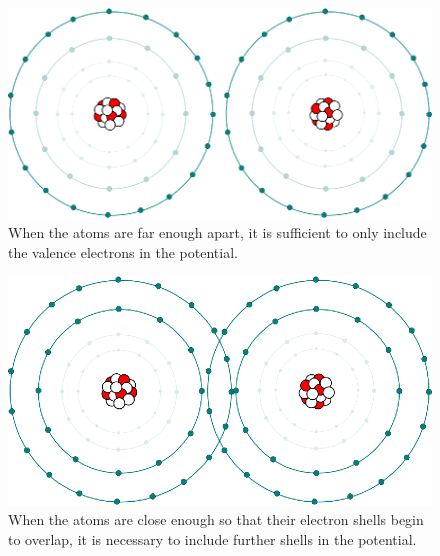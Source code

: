 \documentclass{article}
\begin{document}


\begin{figure}[H]
  \centering
  \includegraphics[scale=0.9]{img/pseudo-pot-far.eps}
  \caption{When the atoms are far enough apart, it is sufficient to only include the valence electrons in the potential.}
  \label{fig:pseudo-pot-far}
\end{figure}

\begin{figure}[H]
  \centering
  \includegraphics[scale=0.9]{img/pseudo-pot-near.eps}
  \caption{When the atoms are close enough so that their electron shells begin to overlap, it is necessary to include further shells in the potential.}
  \label{fig:pseudo-pot-near}
\end{figure}
\end{document}
